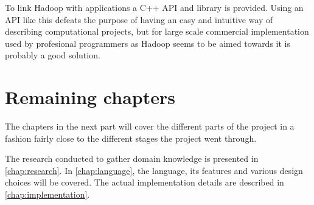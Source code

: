 To link Hadoop with applications a C++ API and library is
provided. Using an API like this defeats the purpose of having an easy
and intuitive way of describing computational projects, but for large
scale commercial implementation used by profesional programmers as
Hadoop seems to be aimed towards it is probably a good solution.


\section{Remaining chapters}
The chapters in the next part will cover the different parts of the
project in a fashion fairly close to the different stages the project
went through.

The research conducted to gather domain knowledge is presented in
\autoref{chap:research}. In \autoref{chap:language}, the language, its
features and various design choices will be covered. The actual
implementation details are described in \autoref{chap:implementation}.
